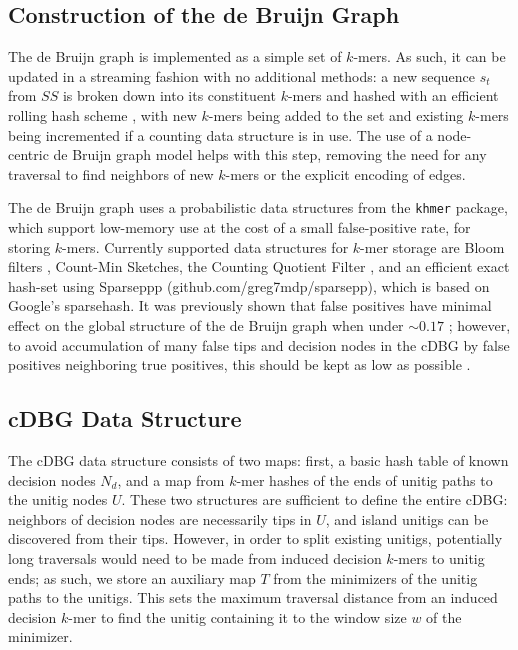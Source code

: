 \documentclass[preprint,number,12pt]{elsarticle}
\begin{document}
\subsection{Construction of the de Bruijn Graph}\label{sec:dbg-construction}

The de Bruijn graph is implemented as a simple set of $k$-mers.
As such, it can be updated in a streaming fashion with no additional methods: a new sequence $s_t$ from $SS$ is broken down into its constituent $k$-mers and hashed with an efficient rolling hash scheme \cite{lemire2010recursive}, with new $k$-mers being added to the set and existing $k$-mers being incremented if a counting data structure is in use.
The use of a node-centric de Bruijn graph model helps with this step, removing the need for any traversal to find neighbors of new $k$-mers or the explicit encoding of edges.

The de Bruijn graph uses a probabilistic data structures from the \texttt{khmer} \cite{crusoe2015khmer,pell_scaling_2012} package, which support low-memory use at the cost of a small false-positive rate, for storing $k$-mers. Currently supported data structures for $k$-mer storage are Bloom filters \cite{bloom_space/time_1970}, Count-Min Sketches, the Counting Quotient Filter \cite{cqf2017}, and an efficient exact hash-set using Sparseppp (github.com/greg7mdp/sparsepp), which is based on Google's sparsehash. 
It was previously shown that false positives have minimal effect on the global structure of the de Bruijn graph when under $\sim0.17$ \cite{pell_scaling_2012}; however, to avoid accumulation of many false tips and decision nodes in the cDBG by false positives neighboring true positives, this should be kept as low as possible \cite{chikhi_space-efficient_2013}.

\subsection{cDBG Data Structure}\label{sec:cdbg-data-structure}

The cDBG data structure consists of two maps: first, a basic hash table of known decision nodes $N_d$, and a map from $k$-mer hashes of the ends of unitig paths to the unitig nodes $U$. These two structures are sufficient to define the entire cDBG: neighbors of decision nodes are necessarily tips in $U$, and island unitigs can be discovered from their tips. However, in order to split existing unitigs, potentially long traversals would need to be made from induced decision $k$-mers to unitig ends; as such, we store an auxiliary map $T$ from the minimizers of the unitig paths to the unitigs. This sets the maximum traversal distance from an induced decision $k$-mer to find the unitig containing it to the window size $w$ of the minimizer.
\end{document}
